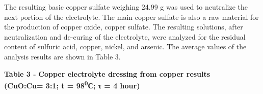 The resulting basic copper sulfate weighing 24.99 g was used to
neutralize the next portion of the electrolyte. The main copper sulfate
is also a raw material for the production of copper oxide, copper
sulfate. The resulting solutions, after neutralization and de-curing of
the electrolyte, were analyzed for the residual content of sulfuric
acid, copper, nickel, and arsenic. The average values of the analysis
results are shown in Table 3.

{\bfseries Table 3 -} {\bfseries Copper electrolyte dressing from copper
results\\
(CuO:Cu= 3:1; t = 98\textsuperscript{0}С; τ = 4 hour)}

